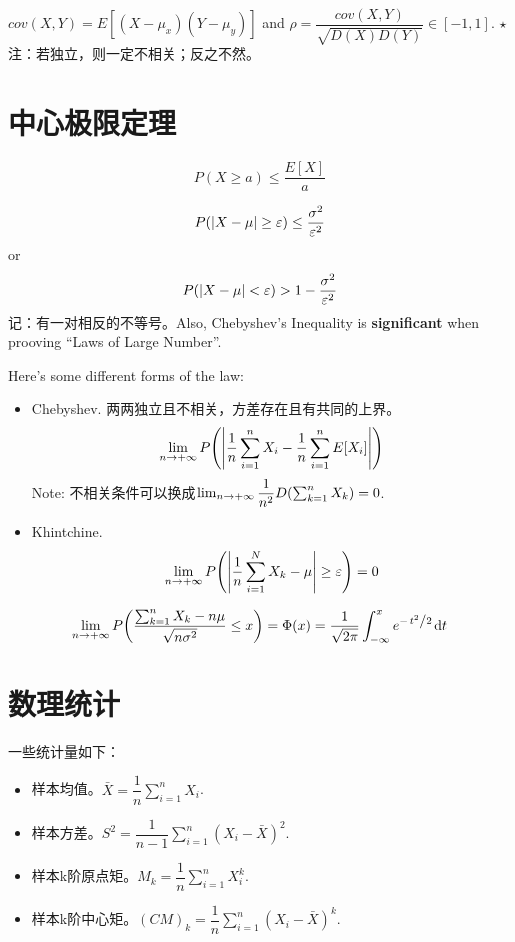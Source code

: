 \documentclass{article}
\begin{document}
\begin{defi}
	$cov(X,Y)=E[(X-\mu_x)(Y-\mu_y)]$ and
	$\rho=\dfrac{cov(X,Y)}{\sqrt{D(X)D(Y)}}\in [-1,1]$. $\star$ 注：若独立，则一定不相关；反之不然。
\end{defi}

\section{中心极限定理}
\begin{thm}
	\[P(X\ge a)\le \frac{E[X]}{a}\]
\end{thm}

\begin{thm}
    \[
		P\qty(\abs{X-\mu}\ge\varepsilon)\le\frac{\sigma^2}{\varepsilon^2}
    \] or 
	\[
		P\qty(\abs{X-\mu}<\varepsilon)>1-\frac{\sigma^2}{\varepsilon^2}
	\] 
	记：有一对相反的不等号。Also, Chebyshev's Inequality is \textbf{\color{Purple}significant} when prooving ``Laws of Large Number''.
\end{thm}

\newpage
\begin{thm}
    Here's some different forms of the law:
	\begin{itemize}
		\item Chebyshev.
			两两独立且不相关，方差存在且有共同的上界。
			\[
				\lim_{n\to+\infty}P\qty(\qty|\frac{1}{n}\sum_{i=1}^nX_i-\frac{1}{n}\sum_{i=1}^nE[X_i]|)
			\] 
			Note: 不相关条件可以换成$\lim_{n\to+\infty}\dfrac{1}{n^2}D\qty(\sum_{k=1}^nX_k)=0$.
		\item Khintchine.
			\[
				\lim_{n\to+\infty}P\qty(\qty|\frac{1}{n}\sum_{i=1}^NX_k-\mu|\ge\varepsilon)=0
			\] 
	\end{itemize}
\end{thm}

\begin{thm}[CLT]
    \[
		\lim_{n\to+\infty}P
		\qty(\frac{\sum_{k=1}^nX_k-n\mu}{\sqrt{n\sigma^2}}\le x)
		=
		\Phi(x)
		=
		\frac{1}{\sqrt{2\pi}}\int_{-\infty}^xe^{-\flatfrac{t^2}{2}}\dd t
    \] 
\end{thm}

\section{数理统计}

\begin{defi}
    一些统计量如下：
	\begin{itemize}
		\item 样本均值。$\bar{X}=\dfrac{1}{n}\sum_{i=1}^nX_i$.
		\item 样本方差。$S^2=\dfrac{1}{n-1}\sum_{i=1}^n(X_i-\bar{X})^2$.
		\item 样本k阶原点矩。$M_k=\dfrac{1}{n}\sum_{i=1}^nX_i^k$.
		\item 样本k阶中心矩。$(CM)_k=\dfrac{1}{n}\sum_{i=1}^n(X_i-\bar{X})^k$.
	\end{itemize}
\end{defi}
\end{document}

